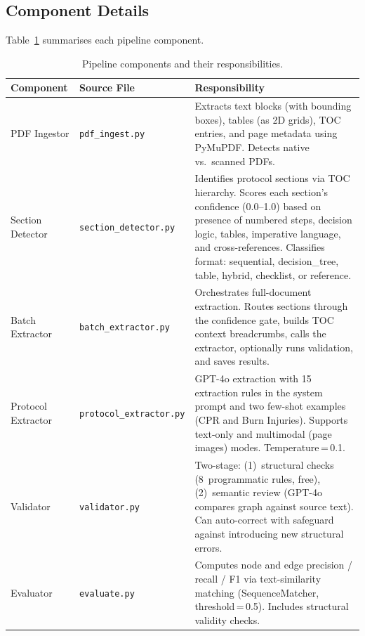 \documentclass[12pt,a4paper]{article}
\begin{document}
\subsection{Component Details}

Table~\ref{tab:components} summarises each pipeline component.

\begin{table}[H]
\centering
\caption{Pipeline components and their responsibilities.}
\label{tab:components}
\begin{tabularx}{\textwidth}{l l X}
\toprule
\textbf{Component} & \textbf{Source File} & \textbf{Responsibility} \\
\midrule
PDF Ingestor & \texttt{pdf\_ingest.py} & Extracts text blocks (with bounding boxes), tables (as 2D grids), TOC entries, and page metadata using PyMuPDF. Detects native vs.\ scanned PDFs. \\
\addlinespace
Section Detector & \texttt{section\_detector.py} & Identifies protocol sections via TOC hierarchy. Scores each section's confidence (0.0--1.0) based on presence of numbered steps, decision logic, tables, imperative language, and cross-references. Classifies format: sequential, decision\_tree, table, hybrid, checklist, or reference. \\
\addlinespace
Batch Extractor & \texttt{batch\_extractor.py} & Orchestrates full-document extraction. Routes sections through the confidence gate, builds TOC context breadcrumbs, calls the extractor, optionally runs validation, and saves results. \\
\addlinespace
Protocol Extractor & \texttt{protocol\_extractor.py} & GPT-4o extraction with 15 extraction rules in the system prompt and two few-shot examples (CPR and Burn Injuries). Supports text-only and multimodal (page images) modes. Temperature\,=\,0.1. \\
\addlinespace
Validator & \texttt{validator.py} & Two-stage: (1)~structural checks (8~programmatic rules, free), (2)~semantic review (GPT-4o compares graph against source text). Can auto-correct with safeguard against introducing new structural errors. \\
\addlinespace
Evaluator & \texttt{evaluate.py} & Computes node and edge precision / recall / F1 via text-similarity matching (SequenceMatcher, threshold\,=\,0.5). Includes structural validity checks. \\
\bottomrule
\end{tabularx}
\end{table}
\end{document}
